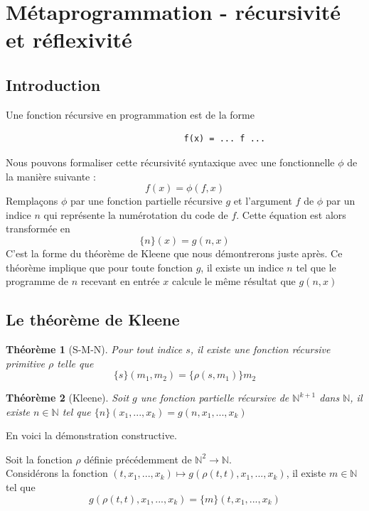 \documentclass[11pt]{book}
\newtheorem{theoreme}{Théorème}
\begin{document}
\section{Métaprogrammation - récursivité et réflexivité}
\subsection{Introduction}
Une fonction récursive en programmation est de la forme
\begin{center}	
\begin{Verbatim}
                                   f(x) = ... f ...
\end{Verbatim}
\end{center}

Nous pouvons formaliser cette récursivité syntaxique avec une fonctionnelle $\phi$ de la manière suivante :
$$
f(x)=\phi(f,x)
$$
Remplaçons $\phi$ par une fonction partielle récursive $g$ et l'argument $f$ de $\phi$ par un indice $n$ qui représente la numérotation 
du code de $f$. Cette équation est alors transformée en 
$$ \{n\}(x)=g(n,x)$$
C'est la forme du théorème de Kleene que nous démontrerons juste après. Ce théorème implique que pour toute fonction $g$,
il existe un indice $n$ tel que  le programme de $n$ recevant en entrée $x$ calcule le même résultat que $g(n,x)$	

\subsection{Le théorème de Kleene}
\begin{theoreme}[S-M-N]
Pour tout indice $s$, il existe une fonction récursive primitive $\rho$ telle que 
$$ \{s\}(m_1,m_2) = \{\rho(s,m_1)\}m_2 $$
\end{theoreme}

\begin{theoreme}[Kleene]
Soit $g$ une fonction partielle récursive de $\mathbb{N}^{k+1}$ dans $\mathbb{N}$, il existe
$n \in \mathbb{N}$ tel que $\{n\}(x_1, ..., x_k) = g (n,x_1, ...,x_k)$
\end{theoreme}

En voici  la démonstration constructive. 

Soit la fonction $\rho$ définie précédemment de $\mathbb{N}^2 \rightarrow \mathbb{N}.$ \\
Considérons la fonction $ (t,x_1,...,x_k) \mapsto g(\rho(t,t), x_1, ..., x_k) $,
il existe  $m \in \mathbb{N}$ tel que $$g(\rho(t,t),x_1, ...,x_k) = \{m\}(t, x_1, ..., x_k)$$ 
\end{document}
